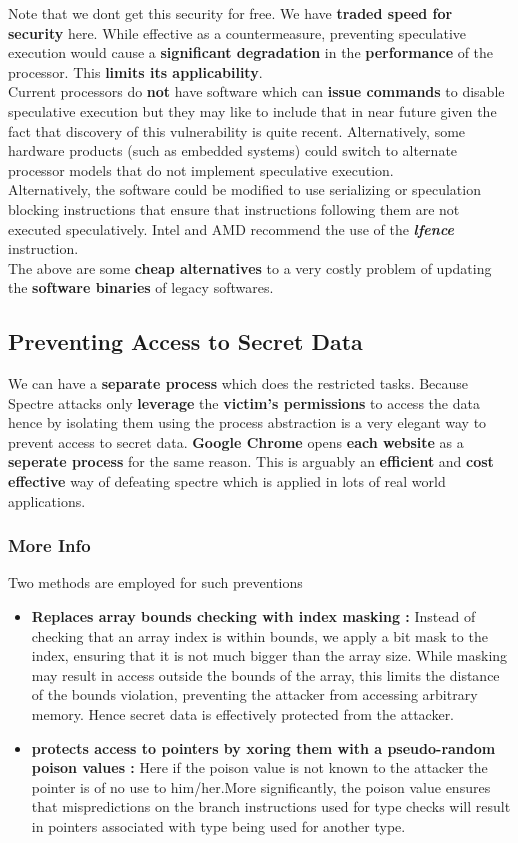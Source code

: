 \documentclass[12pt]{article}
\begin{document}
 Note that we dont get this security for free. We have \textbf{traded speed for security} here. While effective as a countermeasure, preventing speculative execution would cause a \textbf{significant degradation} in the \textbf{performance} of the processor. This \textbf{limits its applicability}. \\

Current processors do \textbf{not} have software which can \textbf{issue commands} to disable speculative execution but they may like to include that in near future given the fact that discovery of this vulnerability is quite recent. Alternatively, some hardware products (such as embedded systems) could switch to alternate processor models that do not implement speculative execution. \\

Alternatively, the software could be modified to use serializing or speculation blocking instructions that ensure that instructions following them are not executed speculatively. Intel and AMD recommend the use of the \textbf{\textit{lfence}} instruction.\\

The above are some \textbf{cheap alternatives} to a very costly problem of updating the \textbf{software binaries} of legacy softwares.
\subsection{Preventing Access to Secret Data}
We can have a \textbf{separate process} which does the restricted tasks. Because Spectre attacks only \textbf{leverage} the \textbf{victim’s permissions} to access the data hence by isolating them using the process abstraction is a very elegant way to prevent access to secret data. \textbf{Google Chrome} opens \textbf{each website} as a \textbf{seperate process} for the same reason. This is arguably an \textbf{efficient} and \textbf{cost effective} way of defeating spectre which is applied in lots of real world applications.
\subsubsection{More Info}
Two methods are employed for such preventions
\begin{itemize}
	\item \textbf{Replaces array bounds checking with index masking	:} Instead of checking that an array index is within bounds, we apply a bit mask to the index, ensuring that it is not much bigger than the array size. While masking may result in access outside the bounds of the array, this limits the distance of the bounds violation, preventing the attacker from accessing arbitrary memory. Hence secret data is effectively protected from the attacker.
	\item \textbf{protects access to pointers by xoring them with a pseudo-random poison values	:} Here if the poison value is not known to the attacker the pointer is of no use to him/her.More significantly, the poison value ensures that mispredictions on the branch instructions used for type checks will result in pointers associated with type being used for another type.
\end{itemize}
\end{document}
